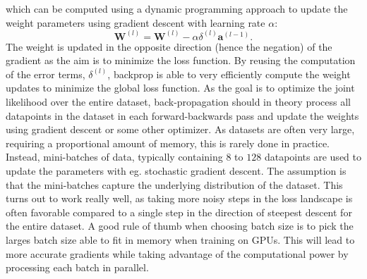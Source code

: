 \documentclass[a4paper,11pt]{article} %
\begin{document}
which can be computed using a dynamic programming approach to update the weight parameters using gradient descent with learning rate $\alpha$:
\begin{equation} \label{eq:weight-update}
  \mathbf{W}^{(l)} = \mathbf{W}^{(l)} -\alpha \delta^{(l)} \mathbf{a}^{(l-1)}.
\end{equation}
The weight is updated in the opposite direction (hence the negation) of the gradient as the aim is to minimize the loss function. By reusing the computation of the error terms, $\delta^{(l)}$, backprop is able to very efficiently compute the weight updates to minimize the global loss function. As the goal is to optimize the joint likelihood over the entire dataset, back-propagation should in theory process all datapoints in the dataset in each forward-backwards pass and update the weights using gradient descent or some other optimizer. As datasets are often very large, requiring a proportional amount of memory, this is rarely done in practice. Instead, mini-batches of data, typically containing $8$ to $128$ datapoints are used to update the parameters with eg. stochastic gradient descent. The assumption is that the mini-batches capture the underlying distribution of the dataset. This turns out to work really well, as taking more noisy steps in the loss landscape is often favorable compared to a single step in the direction of steepest descent for the entire dataset. A good rule of thumb when choosing batch size is to pick the larges batch size able to fit in memory when training on GPUs. This will lead to more accurate gradients while taking advantage of the computational power by processing each batch in parallel. 
\end{document}
